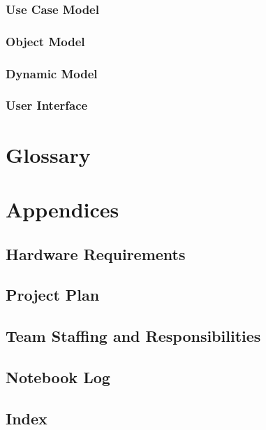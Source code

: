 \documentclass[11pt]{article}
\begin{document}
		\subsubsection{Use Case Model}

		\subsubsection{Object Model}

		\subsubsection{Dynamic Model}

		\subsubsection{User Interface}

\section{Glossary}

\section{Appendices}

	\subsection{Hardware Requirements}

	\subsection{Project Plan}

	\subsection{Team Staffing and Responsibilities}

	\subsection{Notebook Log}

	\subsection{Index}
	\printindex
	
\end{document}
